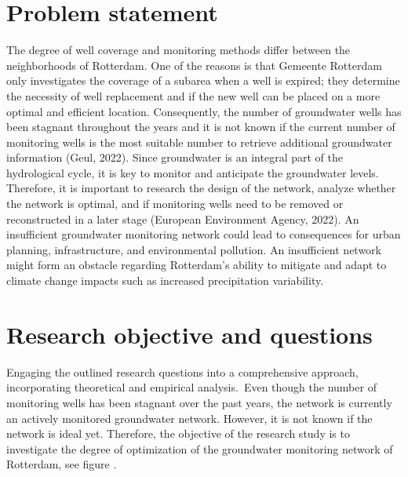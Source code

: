 \section{Problem statement}

The degree of well coverage and monitoring methods differ between the neighborhoods of Rotterdam. One of the reasons is that Gemeente Rotterdam only investigates the coverage of a subarea when a well is expired; they determine the necessity of well replacement and if the new well can be placed on a more optimal and efficient location. Consequently, the number of groundwater wells has been stagnant throughout the years and it is not known if the current number of monitoring wells is the most suitable number to retrieve additional groundwater information (Geul, 2022). Since groundwater is an integral part of the hydrological cycle, it is key to monitor and anticipate the groundwater levels. Therefore, it is important to research the design of the network, analyze whether the network is optimal, and if monitoring wells need to be removed or reconstructed in a later stage (European Environment Agency, 2022). An insufficient groundwater monitoring network could lead to consequences for urban planning, infrastructure, and environmental pollution. An insufficient network might form an obstacle regarding Rotterdam’s ability to mitigate and adapt to climate change impacts such as increased precipitation variability. 
\newpage
\section{Research objective and questions}

Engaging the outlined research questions into a comprehensive approach, incorporating theoretical and empirical analysis. Even though the number of monitoring wells has been stagnant over the past years, the network is currently an actively monitored groundwater network. However, it is not known if the network is ideal yet. Therefore, the objective of the research study is to investigate the degree of optimization of the groundwater monitoring network of Rotterdam, see figure .  \\

